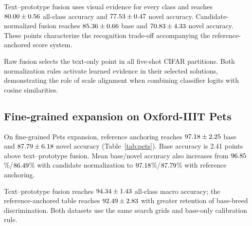 \documentclass[research]{fcs}
\begin{document}
Text--prototype fusion uses visual evidence for every class and reaches $80.00\pm0.56$ all-class accuracy and $77.53\pm0.47$ novel accuracy. Candidate-normalized fusion reaches $85.36\pm0.66$ base and $70.83\pm4.33$ novel accuracy. These points characterize the recognition trade-off accompanying the reference-anchored score system.

Raw fusion selects the text-only point in all five-shot CIFAR partitions. Both normalization rules activate learned evidence in their selected solutions, demonstrating the role of scale alignment when combining classifier logits with cosine similarities.

\subsection{Fine-grained expansion on Oxford-IIIT Pets}
\begin{table}[t]
\centering
\caption{Five-shot Oxford-IIIT Pets expansion from 15 to 30 breeds under long-tailed base supervision. Values are macro accuracy percentages, mean $\pm$ sample standard deviation across three distinct breed partitions. Grids and the base-only calibration rule are transferred from the CIFAR experiment without dataset-specific search expansion.}
\label{tab:pets}
\small
\end{table}

On fine-grained Pets expansion, reference anchoring reaches $97.18\pm2.25$ base and $87.79\pm6.18$ novel accuracy (Table~\ref{tab:pets}). Base accuracy is 2.41 points above text--prototype fusion. Mean base/novel accuracy also increases from $96.85$\%/$86.49$\% with candidate normalization to $97.18$\%/$87.79$\% with reference anchoring.

Text--prototype fusion reaches $94.34\pm1.43$ all-class macro accuracy; the reference-anchored table reaches $92.49\pm2.83$ with greater retention of base-breed discrimination. Both datasets use the same search grids and base-only calibration rule.
\end{document}
